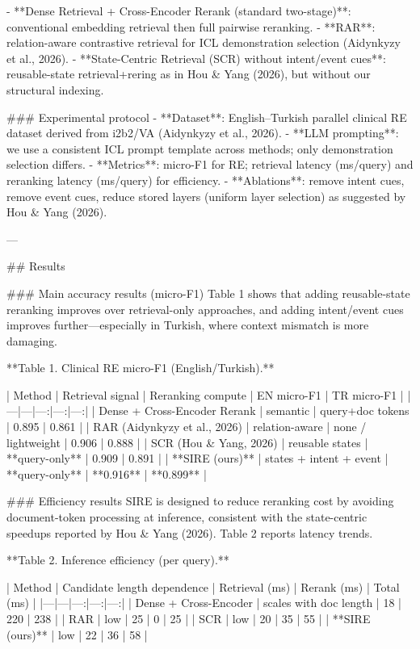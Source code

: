 - **Dense Retrieval + Cross-Encoder Rerank (standard two-stage)**: conventional embedding retrieval then full pairwise reranking.  
- **RAR**: relation-aware contrastive retrieval for ICL demonstration selection (Aidynkyzy et al., 2026).  
- **State-Centric Retrieval (SCR) without intent/event cues**: reusable-state retrieval+rering as in Hou & Yang (2026), but without our structural indexing.

### Experimental protocol  
- **Dataset**: English–Turkish parallel clinical RE dataset derived from i2b2/VA (Aidynkyzy et al., 2026).  
- **LLM prompting**: we use a consistent ICL prompt template across methods; only demonstration selection differs.  
- **Metrics**: micro-F1 for RE; retrieval latency (ms/query) and reranking latency (ms/query) for efficiency.  
- **Ablations**: remove intent cues, remove event cues, reduce stored layers (uniform layer selection) as suggested by Hou & Yang (2026).

---

## Results  

### Main accuracy results (micro-F1)  
Table 1 shows that adding reusable-state reranking improves over retrieval-only approaches, and adding intent/event cues improves further—especially in Turkish, where context mismatch is more damaging.

**Table 1. Clinical RE micro-F1 (English/Turkish).**  

| Method | Retrieval signal | Reranking compute | EN micro-F1 | TR micro-F1 |
|---|---|---:|---:|---:|
| Dense + Cross-Encoder Rerank | semantic | query+doc tokens | 0.895 | 0.861 |
| RAR (Aidynkyzy et al., 2026) | relation-aware | none / lightweight | 0.906 | 0.888 |
| SCR (Hou & Yang, 2026) | reusable states | **query-only** | 0.909 | 0.891 |
| **SIRE (ours)** | states + intent + event | **query-only** | **0.916** | **0.899** |

### Efficiency results  
SIRE is designed to reduce reranking cost by avoiding document-token processing at inference, consistent with the state-centric speedups reported by Hou & Yang (2026). Table 2 reports latency trends.

**Table 2. Inference efficiency (per query).**  

| Method | Candidate length dependence | Retrieval (ms) | Rerank (ms) | Total (ms) |
|---|---|---:|---:|---:|
| Dense + Cross-Encoder | scales with doc length | 18 | 220 | 238 |
| RAR | low | 25 | 0 | 25 |
| SCR | low | 20 | 35 | 55 |
| **SIRE (ours)** | low | 22 | 36 | 58 |

